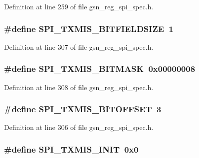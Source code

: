 Definition at line 259 of file gsn\_\-reg\_\-spi\_\-spec.h.

\hypertarget{a00573_a7491d95e1fd8f833e57fbdde2e2e8ffb}{
\subsubsection[{SPI\_\-TXMIS\_\-BITFIELDSIZE}]{\setlength{\rightskip}{0pt plus 5cm}\#define SPI\_\-TXMIS\_\-BITFIELDSIZE~1}}
\label{a00573_a7491d95e1fd8f833e57fbdde2e2e8ffb}


Definition at line 307 of file gsn\_\-reg\_\-spi\_\-spec.h.

\hypertarget{a00573_a7612b8971eec740196ba67c1a724f576}{
\subsubsection[{SPI\_\-TXMIS\_\-BITMASK}]{\setlength{\rightskip}{0pt plus 5cm}\#define SPI\_\-TXMIS\_\-BITMASK~0x00000008}}
\label{a00573_a7612b8971eec740196ba67c1a724f576}


Definition at line 308 of file gsn\_\-reg\_\-spi\_\-spec.h.

\hypertarget{a00573_a6625dd3bc7e72078abe177c01fa2497b}{
\subsubsection[{SPI\_\-TXMIS\_\-BITOFFSET}]{\setlength{\rightskip}{0pt plus 5cm}\#define SPI\_\-TXMIS\_\-BITOFFSET~3}}
\label{a00573_a6625dd3bc7e72078abe177c01fa2497b}


Definition at line 306 of file gsn\_\-reg\_\-spi\_\-spec.h.

\hypertarget{a00573_a1e33eb4eef42d189cc34dc24c8de91bc}{
\subsubsection[{SPI\_\-TXMIS\_\-INIT}]{\setlength{\rightskip}{0pt plus 5cm}\#define SPI\_\-TXMIS\_\-INIT~0x0}}
\label{a00573_a1e33eb4eef42d189cc34dc24c8de91bc}


